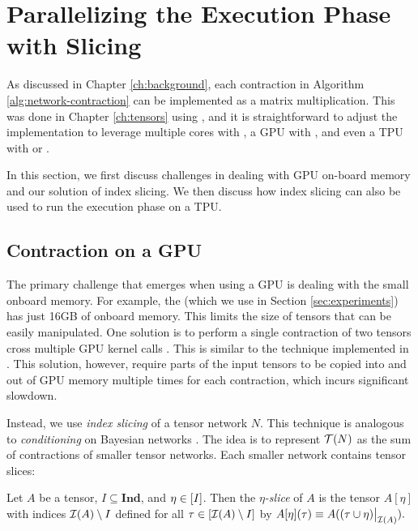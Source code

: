 \section{Parallelizing the Execution Phase with Slicing}
\label{sec:parallel:execution}
As discussed in Chapter \ref{ch:background}, each contraction in Algorithm \ref{alg:network-contraction} can be implemented as a matrix multiplication.
This was done in Chapter \ref{ch:tensors} using  \cite{numpy}, and it is straightforward to adjust the implementation to leverage multiple cores with , a GPU with  \cite{ABCCDDDGII16}, and even a TPU with  or  \cite{jax2018github}.

In this section, we first discuss challenges in dealing with GPU on-board memory and our solution of index slicing. We then discuss how index slicing can also be used to run the execution phase on a TPU.

\subsection{Contraction on a GPU}
The primary challenge that emerges when using a GPU is dealing with the small onboard memory. For example, the  (which we use in Section \ref{sec:experiments}) has just 16GB of onboard memory. This limits the size of tensors that can be easily manipulated. One solution is to perform a single contraction of two tensors cross multiple GPU kernel calls \cite{RRBSKH08}. This is similar to the technique implemented in  \cite{FHZ19}. This solution, however, require parts of the input tensors to be copied into and out of GPU memory multiple times for each contraction, which incurs significant slowdown.

Instead, we use \emph{index slicing} \cite{CZHNS18,GK20,VBNHRBM19} of a tensor network $N$. This technique is analogous to \emph{conditioning} on Bayesian networks \cite{darwiche01,dechter99,pearl86,SAS94}. The idea is to represent $\mathcal{T}(N)$ as the sum of contractions of smaller tensor networks. Each smaller network contains tensor slices:

\begin{definition}
Let $A$ be a tensor, $I \subseteq \textbf{Ind}$, and $\eta \in [I]$. Then the \emph{$\eta$-slice} of $A$ is the tensor $A[\eta]$ with indices $\mathcal{I}(A) \setminus I$ defined for all $\tau \in [\mathcal{I}(A) \setminus I]$ by $A[\eta](\tau) \equiv A((\tau \cup \eta)\big|_{\mathcal{I}(A)}).$
\end{definition}

